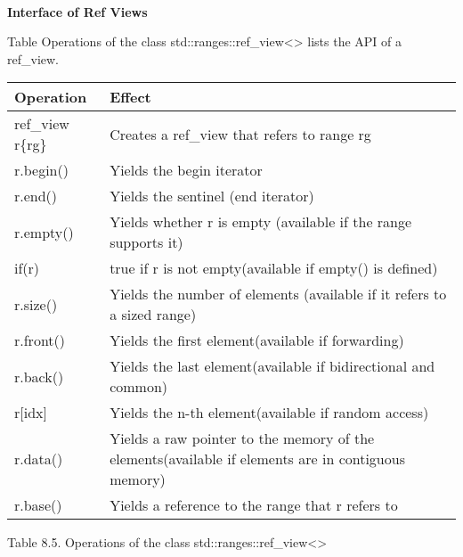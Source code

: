 \noindent
\hspace*{\fill} \\ %
\textbf{Interface of Ref Views}

Table Operations of the class std::ranges::ref\_view<> lists the API of a ref\_view.

\begin{longtable}[c]{|l|l|}
	\hline
	\textbf{Operation} & \textbf{Effect}                                                \\ \hline
	\endfirsthead
	\endhead
	ref\_view r\{rg\}  & Creates a ref\_view that refers to range rg                    \\ \hline
	r.begin()          & Yields the begin iterator                                      \\ \hline
	r.end()            & Yields the sentinel (end iterator)                             \\ \hline
	r.empty()          & Yields whether r is empty (available if the range supports it) \\ \hline
	if(r)              & true if r is not empty(available if empty() is defined)        \\ \hline
	r.size() & Yields the number of elements (available if it refers to a sized range)                            \\ \hline
	r.front()          & Yields the first element(available if forwarding)              \\ \hline
	r.back()           & Yields the last element(available if bidirectional and common) \\ \hline
	r{[}idx{]}         & Yields the n-th element(available if random access)            \\ \hline
	r.data() & Yields a raw pointer to the memory of the elements(available if elements are in contiguous memory) \\ \hline
	r.base()           & Yields a reference to the range that r refers to               \\ \hline
\end{longtable}

\begin{center}
Table 8.5. Operations of the class std::ranges::ref\_view<>
\end{center}


